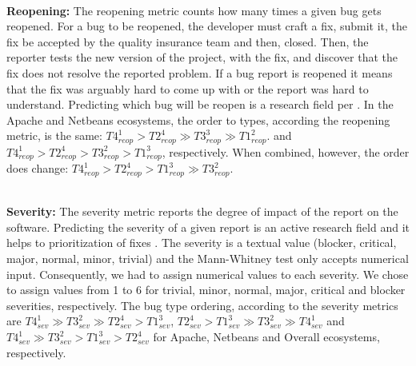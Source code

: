 \\ \vspace{0.1cm} {\bf Reopening: }
The reopening metric counts how many times a given bug gets reopened.
For a bug to be reopened, the developer must craft a fix, submit it, the fix be accepted by the quality insurance team and then, closed.
Then, the reporter tests the new version of the project, with the fix, and discover that the fix does not resolve the reported problem.
If a bug report is reopened it means that the fix was arguably hard to come up with or the report was hard to understand.
Predicting which bug will be reopen is a research field per
\cite{Zimmermann2012}\cite{Shihab2010}\cite{Lo2013}.
In the Apache and Netbeans ecosystems, the order to types, according the reopening metric, is the same:
$
T4_{reop}^1
 >
T2_{reop}^4
 \gg
T3_{reop}^3
 \gg
T1_{reop}^2
$.
and
$
T4_{reop}^1 >
T2_{reop}^4 >
T3_{reop}^2 >
T1_{reop}^3
$, respectively.
When combined, however, the order does change:
$
T4_{reop}^1
 >
T2_{reop}^4
 >
T1_{reop}^3
 \gg
T3_{reop}^2
$.

\\ \vspace{0.1cm} {\bf Severity: } The severity metric reports the degree of impact of the report on the software.
Predicting the severity of a given report is an active research field
\cite{Menzies2008,Guo2010,Lamkanfi2010,Tian2012,ValdiviaGarcia2014, Havelund2015} and it helps to prioritization of fixes \cite{Xuan2012}.
The severity is a textual value (blocker, critical, major, normal, minor, trivial) and the Mann-Whitney test only accepts numerical input.
Consequently, we had to assign numerical values to each severity.
We chose to assign values from 1 to 6 for trivial, minor, normal, major, critical and blocker severities, respectively.
The bug type ordering, according to the severity metrics are
$
T4_{sev}^1
 \gg
T3_{sev}^2
 \gg
T2_{sev}^4
 >
T1_{sev}^3
$,
$
T2_{sev}^4
>
T1_{sev}^3
 \gg
T3_{sev}^2
 \gg
T4_{sev}^1
$
and
$
T4_{sev}^1
 \gg
T3_{sev}^2
 >
T1_{sev}^3
 >
T2_{sev}^4
$
for Apache, Netbeans and Overall ecosystems, respectively.


